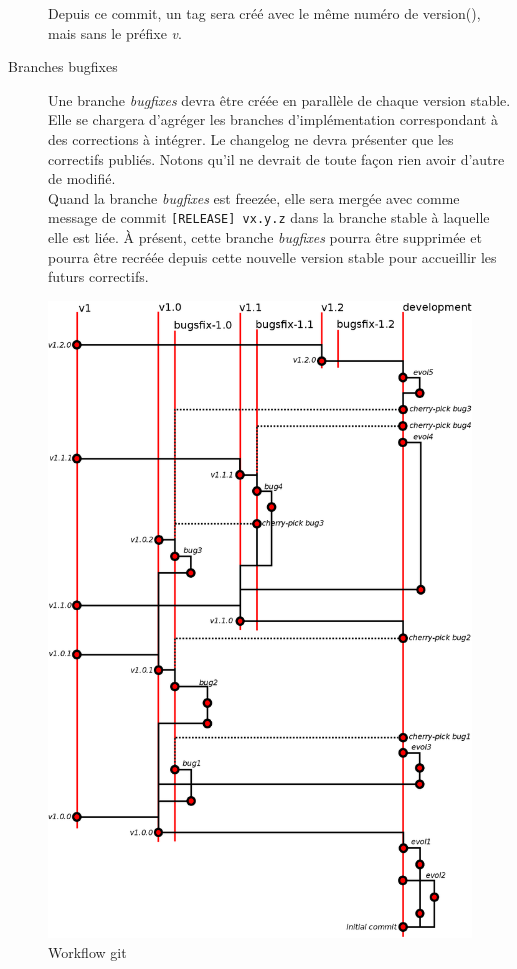 \begin{description}
		Depuis ce commit, un tag sera créé avec le même numéro de version(), mais sans le préfixe \emph{v}.
	\item[Branches bugfixes]
		Une branche \emph{bugfixes} devra être créée en parallèle de chaque version stable.
		Elle se chargera d'agréger les branches d'implémentation correspondant à des corrections à intégrer.
		Le changelog ne devra présenter que les correctifs publiés.
		Notons qu'il ne devrait de toute façon rien avoir d'autre de modifié.\\

		Quand la branche \emph{bugfixes} est freezée, elle sera mergée avec comme message de commit {\tt[RELEASE] vx.y.z} dans la branche stable à laquelle elle est liée.
		À présent, cette branche \emph{bugfixes} pourra être supprimée et pourra être recréée depuis cette nouvelle version stable pour accueillir les futurs correctifs.
\end{description}

\begin{figure}
	\centering
	\includegraphics[scale=0.3]{part/developpement/code/fig_workflow_git.png}
	\caption{Workflow git}
	\label{fig_3.2_git}
\end{figure}

